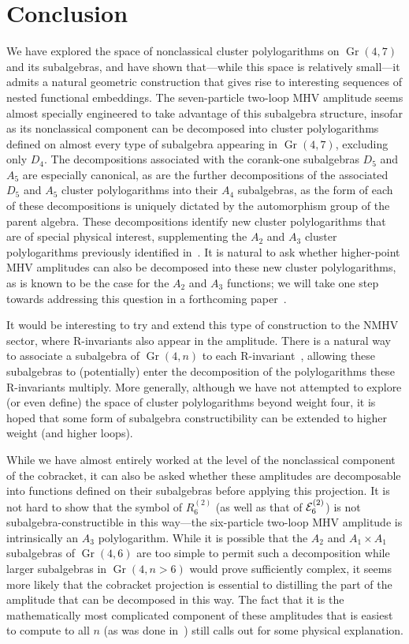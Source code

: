 \documentclass[12pt]{article}
\DeclareMathOperator{\Gr}{Gr}
\begin{document}
\section{Conclusion}

We have explored the space of nonclassical cluster polylogarithms on $\Gr(4,7)$ and its subalgebras, and have shown that---while this space is relatively small---it admits a natural geometric construction that gives rise to interesting sequences of nested functional embeddings. The seven-particle two-loop MHV amplitude seems almost specially engineered to take advantage of this subalgebra structure, insofar as its nonclassical component can be decomposed into cluster polylogarithms defined on almost every type of subalgebra appearing in $\Gr(4,7)$, excluding only $D_4$. The decompositions associated with the corank-one subalgebras $D_5$ and $A_5$ are especially canonical, as are the further decompositions of the associated $D_5$ and $A_5$ cluster polylogarithms into their $A_4$ subalgebras, as the form of each of these decompositions is uniquely dictated by the automorphism group of the parent algebra. These decompositions identify new cluster polylogarithms that are of special physical interest, supplementing the $A_2$ and $A_3$ cluster polylogarithms previously identified in~\cite{Golden:2014xqa}. It is natural to ask whether higher-point MHV amplitudes can also be decomposed into these new cluster polylogarithms, as is known to be the case for the $A_2$ and $A_3$ functions; we will take one step towards addressing this question in a forthcoming paper~\cite{cluster_subalgebras_ii}.

It would be interesting to try and extend this type of construction to the NMHV sector, where R-invariants also appear in the amplitude. There is a natural way to associate a subalgebra of $\Gr(4,n)$ to each R-invariant~\cite{Drummond:2018dfd}, allowing these subalgebras to (potentially) enter the decomposition of the polylogarithms these R-invariants multiply. More generally, although we have not attempted to explore (or even define) the space of cluster polylogarithms beyond weight four, it is hoped that some form of subalgebra constructibility can be extended to higher weight (and higher loops). 

While we have almost entirely worked at the level of the nonclassical component of the cobracket, it can also be asked whether these amplitudes are decomposable into functions defined on their subalgebras before applying this projection. It is not hard to show that the symbol of $R_6^{(2)}$ (as well as that of ${\cal E}_6^{(2)}$) is not subalgebra-constructible in this way---the six-particle two-loop MHV amplitude is intrinsically an $A_3$ polylogarithm. While it is possible that the $A_2$ and $A_1 \times A_1$ subalgebras of $\Gr(4,6)$ are too simple to permit such a decomposition while larger subalgebras in $\Gr(4,n>6)$ would prove sufficiently complex, it seems more likely that the cobracket projection is essential to distilling the part of the amplitude that can be decomposed in this way. The fact that it is the mathematically most complicated component of these amplitudes that is easiest to compute to all $n$ (as was done in~\cite{Golden:2014pua}) still calls out for some physical explanation.
\end{document}
